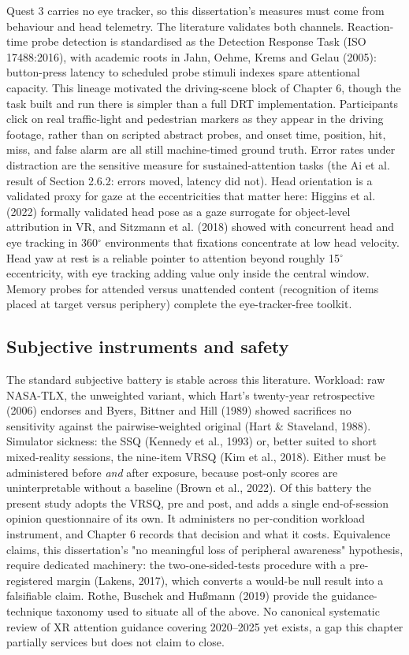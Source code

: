Quest 3 carries no eye tracker, so this dissertation's measures must come from behaviour and head
telemetry. The literature validates both channels. Reaction-time probe detection is standardised as
the Detection Response Task (ISO 17488:2016), with academic roots in Jahn, Oehme, Krems and Gelau
(2005): button-press latency to scheduled probe stimuli indexes spare attentional capacity. This
lineage motivated the driving-scene block of Chapter 6, though the task built and run there is
simpler than a full DRT implementation. Participants click on real traffic-light
and pedestrian markers as they appear in the driving footage, rather than on scripted abstract
probes, and onset time, position, hit, miss, and false alarm are all still machine-timed ground
truth. Error rates under distraction are the sensitive measure
for sustained-attention tasks (the Ai et al. result of Section 2.6.2: errors moved, latency did
not). Head orientation is a validated proxy for gaze at the eccentricities that matter here: Higgins
et al. (2022) formally validated head pose as a gaze surrogate for object-level attribution in VR,
and Sitzmann et al. (2018) showed with concurrent head and eye tracking in 360$^{\circ}$ environments that
fixations concentrate at low head velocity. Head yaw at rest is a reliable pointer to attention
beyond roughly 15$^{\circ}$ eccentricity, with eye tracking adding value only inside the central window.
Memory probes for attended versus unattended content (recognition of items placed at target versus
periphery) complete the eye-tracker-free toolkit.

\subsection{Subjective instruments and safety}

The standard subjective battery is stable across this literature. Workload: raw NASA-TLX, the
unweighted variant, which Hart's twenty-year retrospective (2006) endorses and Byers, Bittner and
Hill (1989) showed sacrifices no sensitivity against the pairwise-weighted original (Hart \&
Staveland, 1988). Simulator sickness: the SSQ (Kennedy et al., 1993) or, better suited to short
mixed-reality sessions, the nine-item VRSQ (Kim et al., 2018). Either must be administered before
\textit{and} after exposure, because post-only scores are uninterpretable without a baseline (Brown et al.,
2022). Of this battery the present study adopts the VRSQ, pre and post, and adds a single
end-of-session opinion questionnaire of its own. It administers no per-condition workload
instrument, and Chapter 6 records that decision and what it costs. Equivalence claims, this
dissertation's "no meaningful loss of peripheral awareness" hypothesis, require dedicated
machinery: the two-one-sided-tests procedure with a pre-registered margin (Lakens, 2017), which
converts a would-be null result into a falsifiable claim. Rothe, Buschek and Hußmann (2019) provide
the guidance-technique taxonomy used to situate all of the above. No canonical systematic review of
XR attention guidance covering 2020–2025 yet exists, a gap this chapter partially services but does
not claim to close.

